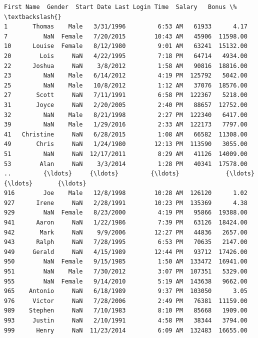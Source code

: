 \documentclass [oneside,10pt,a4paper,ngerman,BCOR10mm,headsepline,parindent,final]{scrartcl}
\makeatletter
\newcommand{\boxspacing}{\kern\kvtcb@left@rule\kern\kvtcb@boxsep}
\newcommand{\prompt}[4]{
        {\ttfamily\llap{{\color{#2}[#3]:\hspace{3pt}#4}}\vspace{-\baselineskip}}
    }
\makeatother
\begin{document}
            \begin{tcolorbox}[breakable, size=fbox, boxrule=.5pt, pad at break*=1mm, opacityfill=0]
\prompt{Out}{outcolor}{146}{\boxspacing}
\begin{Verbatim}[commandchars=\\\{\}]
    First Name  Gender  Start Date Last Login Time  Salary   Bonus \%  \textbackslash{}
1       Thomas    Male   3/31/1996         6:53 AM   61933      4.17
7          NaN  Female   7/20/2015        10:43 AM   45906  11598.00
10      Louise  Female   8/12/1980         9:01 AM   63241  15132.00
20        Lois     NaN   4/22/1995         7:18 PM   64714   4934.00
22      Joshua     NaN    3/8/2012         1:58 AM   90816  18816.00
23         NaN    Male   6/14/2012         4:19 PM  125792   5042.00
25         NaN    Male   10/8/2012         1:12 AM   37076  18576.00
27       Scott     NaN   7/11/1991         6:58 PM  122367   5218.00
31       Joyce     NaN   2/20/2005         2:40 PM   88657  12752.00
32         NaN    Male   8/21/1998         2:27 PM  122340   6417.00
39         NaN    Male   1/29/2016         2:33 AM  122173   7797.00
41   Christine     NaN   6/28/2015         1:08 AM   66582  11308.00
49       Chris     NaN   1/24/1980        12:13 PM  113590   3055.00
51         NaN     NaN  12/17/2011         8:29 AM   41126  14009.00
53        Alan     NaN    3/3/2014         1:28 PM   40341  17578.00
..         {\ldots}     {\ldots}         {\ldots}             {\ldots}     {\ldots}       {\ldots}
916        Joe    Male   12/8/1998        10:28 AM  126120      1.02
927      Irene     NaN   2/28/1991        10:23 PM  135369      4.38
929        NaN  Female   8/23/2000         4:19 PM   95866  19388.00
941      Aaron     NaN   1/22/1986         7:39 PM   63126  18424.00
942       Mark     NaN    9/9/2006        12:27 PM   44836   2657.00
943      Ralph     NaN   7/28/1995         6:53 PM   70635   2147.00
949     Gerald     NaN   4/15/1989        12:44 PM   93712  17426.00
950        NaN  Female   9/15/1985         1:50 AM  133472  16941.00
951        NaN    Male   7/30/2012         3:07 PM  107351   5329.00
955        NaN  Female   9/14/2010         5:19 AM  143638   9662.00
965    Antonio     NaN   6/18/1989         9:37 PM  103050      3.05
976     Victor     NaN   7/28/2006         2:49 PM   76381  11159.00
989    Stephen     NaN   7/10/1983         8:10 PM   85668   1909.00
993     Justin     NaN   2/10/1991         4:58 PM   38344   3794.00
999      Henry     NaN  11/23/2014         6:09 AM  132483  16655.00


\end{Verbatim}
\end{tcolorbox}
\end{document}
